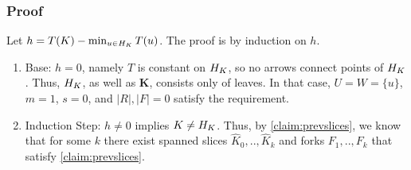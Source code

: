 \documentclass{beamer}
\begin{document}
\begin{frame}
  \frametitle{Proof} 

    Let $h = T(K) - \min_{u \in H_{K}}T(u)$. The proof is by induction on $h$. 
    \begin{enumerate}
      \item Base: $h=0$, namely $T$ is constant on $H_{K}$, so no arrows connect points of $H_{K}$. Thus, $H_{K}$, as well as $\mathbf{K}$, consists only of leaves. In that case, $U = W = \{u\}$, $m=1$, $s=0$, and $|R|, |F| = 0$ satisfy the requirement.
      \item Induction Step: $h \neq 0$ implies $K \neq H_{K}$. Thus, by \cref{claim:prevslices}, we know that for some $k$ there exist spanned slices $\hat{K}_{0}, .., \hat{K}_{k}$ and forks $F_{1},..,F_{k}$ that satisfy \cref{claim:prevslices}. 


\end{enumerate}
\end{frame}
\end{document}
